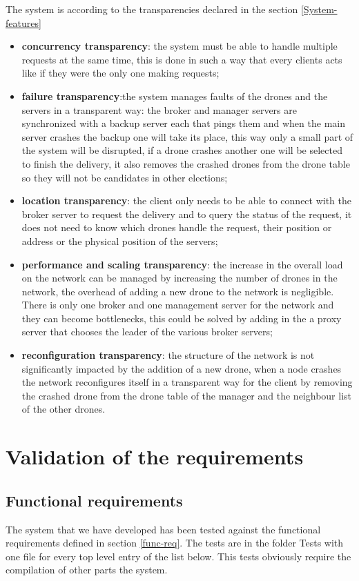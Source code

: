 \documentclass[a4paper, oneside]{memoir}
\begin{document}
The system is according to the transparencies declared in the section \ref{System-features}
\begin{itemize}
	\item \textbf{concurrency transparency}: the system must be able to handle multiple requests at the same time, this is done in such a way that every clients acts like if they were the only one making requests;
	\item \textbf{failure transparency}:the system manages faults of the drones and the servers in a transparent way: the broker and manager servers are synchronized with a backup server each that pings them and when the main server crashes the backup one will take its place, this way only a small part of the system will be disrupted, if a drone crashes another one will be selected to finish the delivery, it also removes the crashed drones from the drone table so they will not be candidates in other elections;
	\item \textbf{location transparency}: the client only needs to be able to connect with the broker server to request the delivery and to query the status of the request, it does not need to know which drones handle the request, their position or address or the physical position of the servers;
	\item \textbf{performance and scaling transparency}: the increase in the overall load on the network can be managed by increasing the number of drones in the network, the overhead of adding a new drone to the network is negligible. There is only one broker and one management server for the network and they can become bottlenecks, this could be solved by adding in the a proxy server that chooses the leader of the various broker servers;
	\item \textbf{reconfiguration transparency}: the structure of the network is not significantly impacted by the addition of a new drone, when a node crashes the network reconfigures itself in a transparent way for the client by removing the crashed drone from the drone table of the manager and the neighbour list of the other drones.
\end{itemize}

\section{Validation of the requirements}

\subsection{Functional requirements}
The system that we have developed has been tested against the functional requirements defined in section \ref{func-req}.
The tests are in the folder \textsf{Tests} with one file for every top level entry of the list below. This tests obviously require the compilation of other parts the system.
\end{document}
